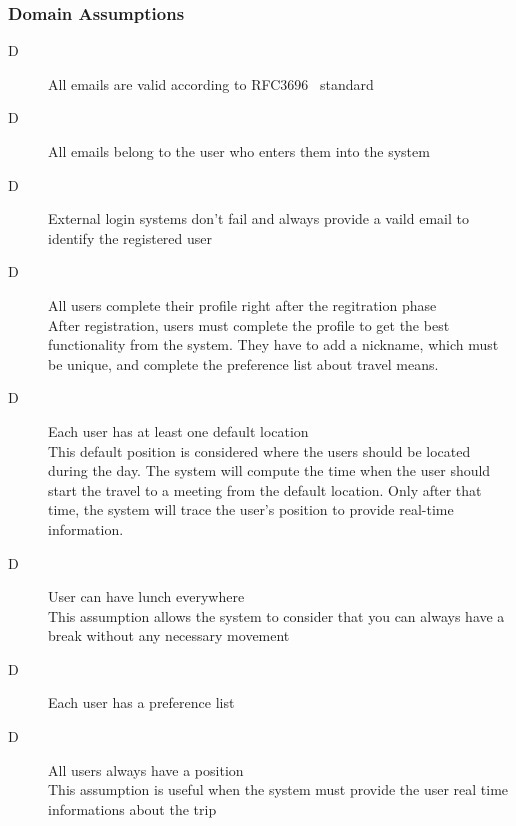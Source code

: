 \subsubsection{Domain Assumptions}

\begin{description}

\item[D\thecountDom]  All emails are valid according to RFC3696~\cite{RFC3696} standard
\item[D\thecountDom]  All emails belong to the user who enters them into the system

\item[D\thecountDom]  External login systems don’t fail and always provide a vaild email to identify the registered user

\item[D\thecountDom]  All users complete their profile right after the regitration phase \\ [0.1cm]
After registration, users must complete the profile to get the best functionality from the system. They have to add a nickname, which must be unique, and complete the preference list about travel means.

\item[D\thecountDom]  Each user has at least one default location \\ [0.1cm]
This default position is considered where the users should be located during the day. The system will compute the time when the user should start the travel to a meeting from the default location. Only after that time, the system will trace the user's position to provide real-time information.

\item[D\thecountDom]  User can have lunch everywhere \\ [0.1cm]
This assumption allows the system to consider that you can always have a break without any necessary movement

\item[D\thecountDom]  Each user has a preference list

\item[D\thecountDom]  All users always have a position \\ [0.1cm]
This assumption is useful when the system must provide the user real time informations about the trip


\end{description}
